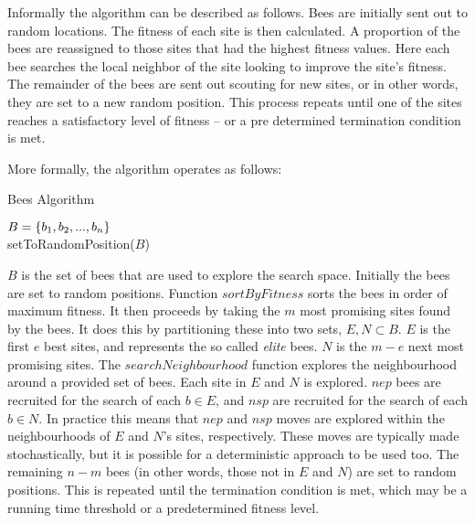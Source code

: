 
Informally the algorithm can be described as follows. Bees are initially sent out to random locations. The fitness of each site is then calculated. A proportion of the bees are reassigned to those sites that had the highest fitness values. Here each bee searches the local neighbor of the site looking to improve the site's fitness. The remainder of the bees are sent out scouting for new sites, or in other words, they are set to a new random position. This process repeats until one of the sites reaches a satisfactory level of fitness -- or a pre determined termination condition is met.

More formally, the algorithm operates as follows:

\begin{algorithm}[H]
   \caption{Bees Algorithm}
   $B = \{b_1, b_2,..., b_n\}$\\
   setToRandomPosition($B$)\\
\end{algorithm}

$B$ is the set of bees that are used to explore the search space. Initially the bees are set to random positions. Function $sortByFitness$ sorts the bees in order of maximum fitness. It then proceeds by taking the $m$ most promising sites found by the bees. It does this by partitioning these into two sets, $E, N \subset B$. $E$ is the first $e$ best sites, and represents the so called \emph{elite} bees. $N$ is the $m - e$ next most promising sites. The $searchNeighbourhood$ function explores the neighbourhood around a provided set of bees. Each site in $E$ and $N$ is explored. $nep$ bees are recruited for the search of each $b \in E$, and $nsp$ are recruited for the search of each $b \in N$. In practice this means that $nep$ and $nsp$ moves are explored within the neighbourhoods of $E$ and $N$'s sites, respectively. These moves are typically made stochastically, but it is possible for a deterministic approach to be used too. The remaining $n - m$ bees (in other words, those not in $E$ and $N$) are set to random positions. This is repeated until the termination condition is met, which may be a running time threshold or a predetermined fitness level. 

